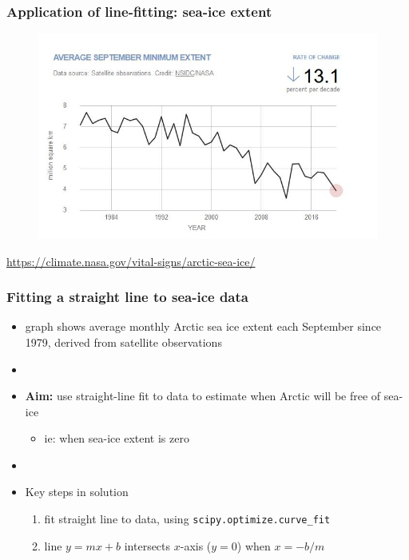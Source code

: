 \documentclass[english,14pt]{beamer}
\begin{document}

\begin{frame}[fragile]

\frametitle{Application of line-fitting: sea-ice extent}

\vspace*{-5mm}

\begin{figure}[ht]
	\centering
	\includegraphics[width=.9\textwidth]{figures/seaiceextent}
\end{figure}

\href{https://climate.nasa.gov/vital-signs/arctic-sea-ice/}{https://climate.nasa.gov/vital-signs/arctic-sea-ice/}

\end{frame}


\begin{frame}[fragile]

\frametitle{Fitting a straight line to sea-ice data}

\begin{itemize}
	\item graph shows average monthly Arctic sea ice extent each September since 1979, derived from satellite observations
	\item[]
	\item[] \textbf{Aim:} use straight-line fit to data to estimate when Arctic will be free of sea-ice
	\begin{itemize}
		\item ie: when sea-ice extent is zero
	\end{itemize}
	\item[]
	\item Key steps in solution
	\begin{enumerate}
		\item fit straight line to data, using \texttt{scipy.optimize.curve\_fit}
		\item line $y = mx + b$ intersects $x$-axis ($y=0$) when $x = -b/m$
	\end{enumerate}
\end{itemize}

\end{frame}
\end{document}
